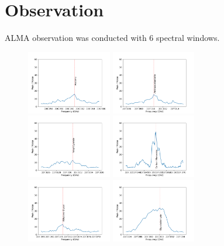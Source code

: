 \documentclass{aa}
\begin{document}
\section{Observation}
   ALMA observation was conducted with 6 spectral windows.
   \begin{figure}
    \includegraphics[width=0.33\textwidth]{spw0_(CH3)2CO}
    \includegraphics[width=0.33\textwidth]{spw0_H2NCH2CN}
    \includegraphics[width=0.33\textwidth]{spw0_CH2CHCN}
    \includegraphics[width=0.33\textwidth]{spw0_C17O}
    \includegraphics[width=0.33\textwidth]{spw0_(CH2OH)2}
    \includegraphics[width=0.33\textwidth]{spw0_CH2OHCHO}

\end{figure}
\end{document}
